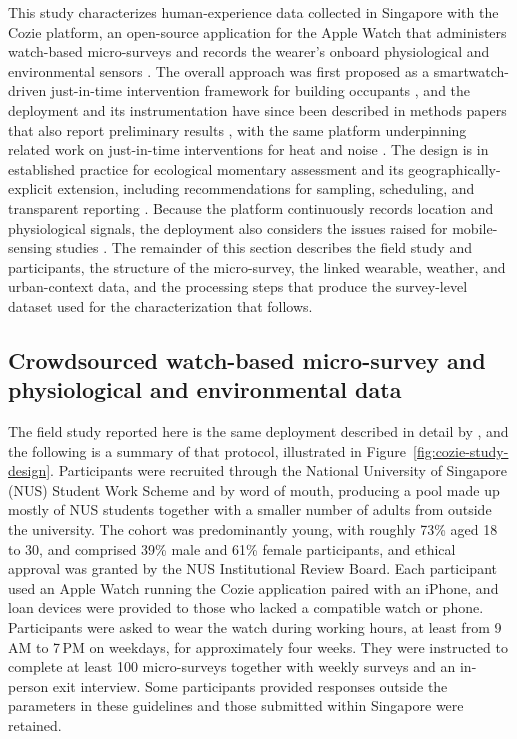 \documentclass[]{interact}
\begin{document}
This study characterizes human-experience data collected in Singapore with the Cozie platform, an open-source application for the Apple Watch that administers watch-based micro-surveys and records the wearer's onboard physiological and environmental sensors \citep{Tartarini2023-iu}.
The overall approach was first proposed as a smartwatch-driven just-in-time intervention framework for building occupants \citep{Miller2022-dy}, and the deployment and its instrumentation have since been described in methods papers that also report preliminary results \citep{Miller2023-wi,Miller2025-qu}, with the same platform underpinning related work on just-in-time interventions for heat and noise \citep{Miller2025-sv}.
The design is in established practice for ecological momentary assessment and its geographically-explicit extension, including recommendations for sampling, scheduling, and transparent reporting \citep{Reichert2020-fs,Kingsbury2024-qe}.
Because the platform continuously records location and physiological signals, the deployment also considers the issues raised for mobile-sensing studies \citep{Fuller2017-xg}.
The remainder of this section describes the field study and participants, the structure of the micro-survey, the linked wearable, weather, and urban-context data, and the processing steps that produce the survey-level dataset used for the characterization that follows.

\subsection{Crowdsourced watch-based micro-survey and physiological and environmental data}\label{sec:methods-context}
The field study reported here is the same deployment described in detail by \citet{Miller2025-sv}, and the following is a summary of that protocol, illustrated in Figure~\ref{fig:cozie-study-design}.
Participants were recruited through the National University of Singapore (NUS) Student Work Scheme and by word of mouth, producing a pool made up mostly of NUS students together with a smaller number of adults from outside the university.
The cohort was predominantly young, with roughly 73\% aged 18 to 30, and comprised 39\% male and 61\% female participants, and ethical approval was granted by the NUS Institutional Review Board.
Each participant used an Apple Watch running the Cozie application paired with an iPhone, and loan devices were provided to those who lacked a compatible watch or phone.
Participants were asked to wear the watch during working hours, at least from 9\,AM to 7\,PM on weekdays, for approximately four weeks.
They were instructed to complete at least 100 micro-surveys together with weekly surveys and an in-person exit interview. 
Some participants provided responses outside the parameters in these guidelines and those submitted within Singapore were retained.
\end{document}
